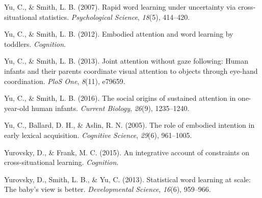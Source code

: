 \documentclass[oneside]{report}
\begin{document}
\hypertarget{ref-yu2007rapid}{}
Yu, C., \& Smith, L. B. (2007). Rapid word learning under uncertainty
via cross-situational statistics. \emph{Psychological Science},
\emph{18}(5), 414--420.

\hypertarget{ref-yu2012embodied}{}
Yu, C., \& Smith, L. B. (2012). Embodied attention and word learning by
toddlers. \emph{Cognition}.

\hypertarget{ref-yu2013joint}{}
Yu, C., \& Smith, L. B. (2013). Joint attention without gaze following:
Human infants and their parents coordinate visual attention to objects
through eye-hand coordination. \emph{PloS One}, \emph{8}(11), e79659.

\hypertarget{ref-yu2016social}{}
Yu, C., \& Smith, L. B. (2016). The social origins of sustained
attention in one-year-old human infants. \emph{Current Biology},
\emph{26}(9), 1235--1240.

\hypertarget{ref-yu2005role}{}
Yu, C., Ballard, D. H., \& Aslin, R. N. (2005). The role of embodied
intention in early lexical acquisition. \emph{Cognitive Science},
\emph{29}(6), 961--1005.

\hypertarget{ref-yurovsky2014algorithmic}{}
Yurovsky, D., \& Frank, M. C. (2015). An integrative account of
constraints on cross-situational learning. \emph{Cognition}.

\hypertarget{ref-yurovsky2013statistical}{}
Yurovsky, D., Smith, L. B., \& Yu, C. (2013). Statistical word learning
at scale: The baby's view is better. \emph{Developmental Science},
\emph{16}(6), 959--966.


\end{document}
